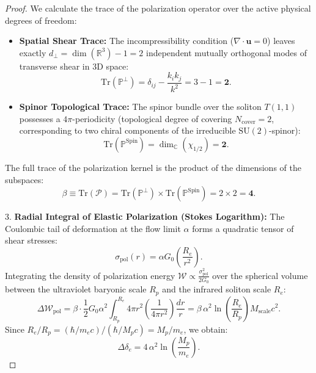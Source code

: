 \documentclass[12pt,a4paper]{article}
\begin{document}
\begin{proof}
	We calculate the trace of the polarization operator over the active physical degrees of freedom:
	\begin{itemize}
	\item \textbf{Spatial Shear Trace:} The incompressibility condition ($\nabla \cdot \mathbf{u} = 0$) leaves exactly $d_\perp = \dim(\mathbb{R}^3) - 1 = 2$ independent mutually orthogonal modes of transverse shear in 3D space:
	\begin{equation}
	\mathrm{Tr}(\mathbb{P}^\perp) = \delta_{ij} - \frac{k_i k_j}{k^2} = 3 - 1 = \mathbf{2}.
	\end{equation}
	\item \textbf{Spinor Topological Trace:} The spinor bundle over the soliton $T(1,1)$ possesses a $4\pi$-periodicity (topological degree of covering $N_{\text{cover}} = 2$, corresponding to two chiral components of the irreducible $\mathrm{SU}(2)$-spinor):
	\begin{equation}
	\mathrm{Tr}(\mathbb{P}^{\mathrm{Spin}}) = \dim_{\mathbb{C}}(\chi_{1/2}) = \mathbf{2}.
	\end{equation}
	\end{itemize}
	The full trace of the polarization kernel is the product of the dimensions of the subspaces:
	\begin{equation}
	\beta \equiv \mathrm{Tr}\left( \mathcal{P} \right) = \mathrm{Tr}(\mathbb{P}^\perp) \times \mathrm{Tr}(\mathbb{P}^{\mathrm{Spin}}) = 2 \times 2 = \mathbf{4}.
	\end{equation}
				
	3. \textbf{Radial Integral of Elastic Polarization (Stokes Logarithm):}
	The Coulombic tail of deformation at the flow limit $\alpha$ forms a quadratic tensor of shear stresses:
	\begin{equation}
	\sigma_{\text{pol}}(r) = \alpha G_0 \left( \frac{R_e}{r^2} \right).
	\end{equation}
	Integrating the density of polarization energy $\mathcal{W} \propto \frac{\sigma_{\text{pol}}^2}{2 G_0}$ over the spherical volume between the ultraviolet baryonic scale $R_p$ and the infrared soliton scale $R_e$:
	\begin{equation}
	\Delta \mathcal{W}_{\text{pol}} = \beta \cdot \frac{1}{2} G_0 \alpha^2 \int_{R_p}^{R_e} 4\pi r^2 \left( \frac{1}{4\pi r^2} \right) \frac{dr}{r} = \beta \, \alpha^2 \ln\left( \frac{R_e}{R_p} \right) M_{\text{scale}} c^2.
	\end{equation}
	Since $R_e / R_p = (\hbar / m_e c) / (\hbar / M_p c) = M_p / m_e$, we obtain:
	\begin{equation}
	\Delta \delta_e = 4 \, \alpha^2 \ln\left( \frac{M_p}{m_e} \right).
	\end{equation}
	\end{proof}
			
\end{document}
